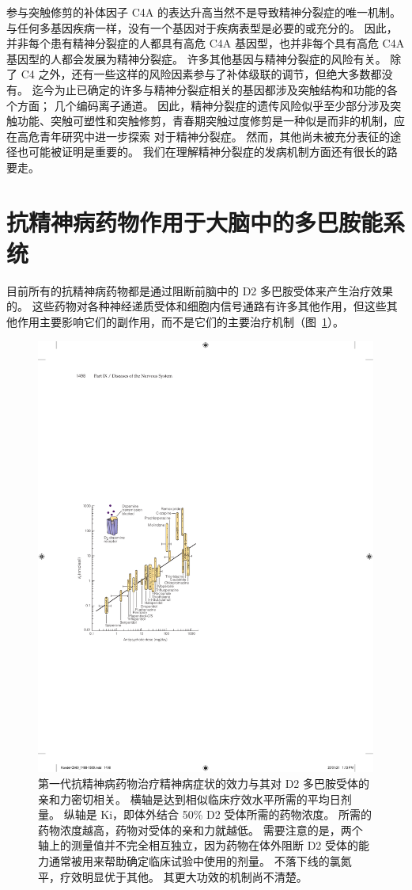 参与突触修剪的补体因子 C4A 的表达升高当然不是导致精神分裂症的唯一机制。
与任何多基因疾病一样，没有一个基因对于疾病表型是必要的或充分的。
因此，并非每个患有精神分裂症的人都具有高危 C4A 基因型，也并非每个具有高危 C4A 基因型的人都会发展为精神分裂症。 许多其他基因与精神分裂症的风险有关。
除了 C4 之外，还有一些这样的风险因素参与了补体级联的调节，但绝大多数都没有。
迄今为止已确定的许多与精神分裂症相关的基因都涉及突触结构和功能的各个方面；
几个编码离子通道。
因此，精神分裂症的遗传风险似乎至少部分涉及突触功能、突触可塑性和突触修剪，青春期突触过度修剪是一种似是而非的机制，应在高危青年研究中进一步探索 对于精神分裂症。
然而，其他尚未被充分表征的途径也可能被证明是重要的。
我们在理解精神分裂症的发病机制方面还有很长的路要走。



\section{抗精神病药物作用于大脑中的多巴胺能系统}

目前所有的抗精神病药物都是通过阻断前脑中的 D2 多巴胺受体来产生治疗效果的。
这些药物对各种神经递质受体和细胞内信号通路有许多其他作用，但这些其他作用主要影响它们的副作用，而不是它们的主要治疗机制（图~\ref{fig:60_8}）。


\begin{figure}[htbp]
	\centering
	\includegraphics[width=0.5\linewidth]{chap60/fig_60_8}
	\caption{第一代抗精神病药物治疗精神病症状的效力与其对 D2 多巴胺受体的亲和力密切相关。
		横轴是达到相似临床疗效水平所需的平均日剂量。
		纵轴是 Ki，即体外结合 50\% D2 受体所需的药物浓度。
		所需的药物浓度越高，药物对受体的亲和力就越低。
		需要注意的是，两个轴上的测量值并不完全相互独立，因为药物在体外阻断 D2 受体的能力通常被用来帮助确定临床试验中使用的剂量。
		不落下线的氯氮平，疗效明显优于其他。 其更大功效的机制尚不清楚\cite{seeman1976antipsychotic}。}
	\label{fig:60_8}
\end{figure}


